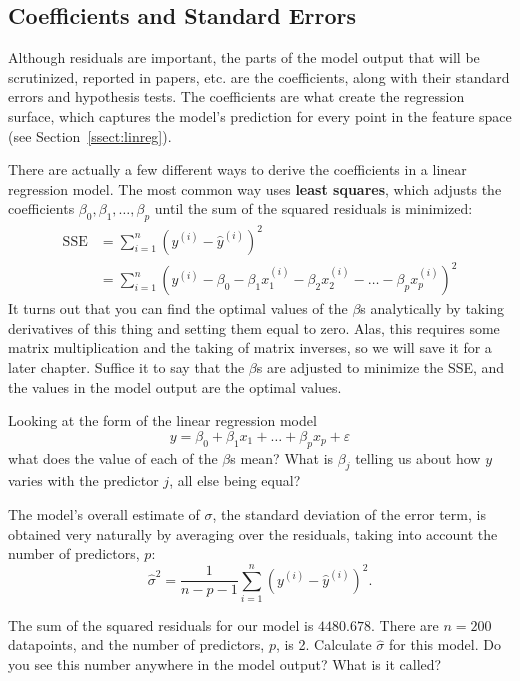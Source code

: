 \subsection{Coefficients and Standard Errors}

Although residuals are important, the parts of the model output that will be scrutinized, reported in papers, etc. are the coefficients, along with their standard errors and hypothesis tests. The coefficients are what create the regression surface, which captures the model's prediction for every point in the feature space (see Section~\ref{ssect:linreg}). 

There are actually a few different ways to derive the coefficients in a linear regression model. The most common way uses \textbf{least squares}, which adjusts the coefficients $\beta_0, \beta_1, \dots, \beta_p$ until the sum of the squared residuals is minimized:
\begin{align*} \text{SSE} &= \sum_{i=1}^n (y^{(i)} - \hat{y}^{(i)})^2 \\
&= \sum_{i=1}^n (y^{(i)} - \beta_0 - \beta_1 x_1^{(i)} - \beta_2 x_2^{(i)} - \dots - \beta_p x_p^{(i)})^2 \end{align*}
It turns out that you can find the optimal values of the $\beta$s analytically by taking derivatives of this thing and setting them equal to zero. Alas, this requires some matrix multiplication and the taking of matrix inverses, so we will save it for a later chapter. Suffice it to say that the $\beta$s are adjusted to minimize the SSE, and the values in the model output are the optimal values.
\vspace{5mm}

\begin{question}{}
Looking at the form of the linear regression model
$$ y = \beta_0 + \beta_1 x_1 + \dots + \beta_p x_p + \varepsilon $$
what does the value of each of the $\beta$s mean? What is $\beta_j$ telling us about how $y$ varies with the predictor $j$, all else being equal?
\end{question}

The model's overall estimate of $\sigma$, the standard deviation of the error term, is obtained very naturally by averaging over the residuals, taking into account the number of predictors, $p$:
$$ \hat{\sigma}^2 = \frac{1}{n-p-1} \sum_{i=1}^n (y^{(i)} - \hat{y}^{(i)})^2.$$

\begin{question}{}
The sum of the squared residuals for our model is $4480.678$. There are $n=200$ datapoints, and the number of predictors, $p$, is 2. Calculate $\hat{\sigma}$ for this model. Do you see this number anywhere in the model output? What is it called?
\end{question}


